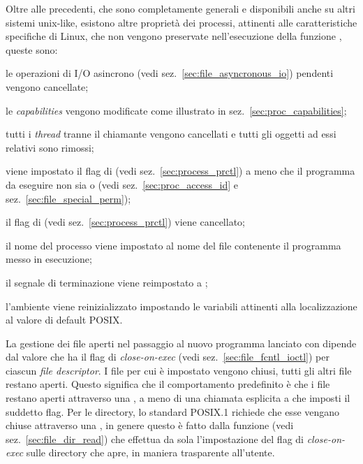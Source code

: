 Oltre alle precedenti, che sono completamente generali e disponibili anche su
altri sistemi unix-like, esistono altre proprietà dei processi, attinenti alle
caratteristiche specifiche di Linux, che non vengono preservate
nell'esecuzione della funzione , queste sono:
\begin{itemize*}
\item le operazioni di I/O asincrono (vedi sez.~\ref{sec:file_asyncronous_io})
  pendenti vengono cancellate;
\item le \textit{capabilities} vengono modificate come
  illustrato in sez.~\ref{sec:proc_capabilities};
\item tutti i \textit{thread} tranne il chiamante vengono cancellati e tutti gli oggetti ad essi
  relativi sono rimossi;
\item viene impostato il flag  di  (vedi
  sez.~\ref{sec:process_prctl}) a meno che il programma da eseguire non sia
   o  (vedi sez.~\ref{sec:proc_access_id} e
  sez.~\ref{sec:file_special_perm});
\item il flag  di  (vedi
  sez.~\ref{sec:process_prctl}) viene cancellato;
\item il nome del processo viene impostato al nome del file contenente il
  programma messo in esecuzione;
\item il segnale di terminazione viene reimpostato a ;
\item l'ambiente viene reinizializzato impostando le variabili attinenti alla
  localizzazione al valore di default POSIX. 
\end{itemize*}


La gestione dei file aperti nel passaggio al nuovo programma lanciato con
 dipende dal valore che ha il flag di \textit{close-on-exec} (vedi
sez.~\ref{sec:file_fcntl_ioctl}) per ciascun \textit{file descriptor}. I file
per cui è impostato vengono chiusi, tutti gli altri file restano
aperti. Questo significa che il comportamento predefinito è che i file restano
aperti attraverso una , a meno di una chiamata esplicita a
 che imposti il suddetto flag.  Per le directory, lo standard
POSIX.1 richiede che esse vengano chiuse attraverso una , in genere
questo è fatto dalla funzione  (vedi
sez.~\ref{sec:file_dir_read}) che effettua da sola l'impostazione del flag di
\textit{close-on-exec} sulle directory che apre, in maniera trasparente
all'utente.

